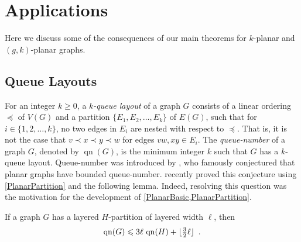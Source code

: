 \documentclass{patmorin}
\DeclareMathOperator{\tw}{tw}
\DeclareMathOperator{\qn}{qn}
\DeclarePairedDelimiter{\floor}{\lfloor}{\rfloor}
\renewcommand{\le}{\leqslant}
\renewcommand{\geq}{\geqslant}
\begin{document}
% 

\section{Applications}
\label{Applications}

Here we discuss some of the consequences of our main theorems for $k$-planar and $(g,k)$-planar graphs. 

\subsection{Queue Layouts}

For an integer $k\geq 0$, a \textit{$k$-queue layout} of a graph $G$ consists of a linear ordering $\preceq$ of $V(G)$ and a partition $\{E_1,E_2,\dots,E_k\}$ of $E(G)$, such that for $i\in\{1,2,\dots,k\}$, no two edges in $E_i$ are nested with respect to $\preceq$. That is, it is not the case that $v\prec x \prec y \prec w$ for edges $vw,xy\in E_i$. The \textit{queue-number} of a graph $G$, denoted by $\qn(G)$, is the minimum integer $k$ such that $G$ has a $k$-queue layout. Queue-number was introduced by \citet{HLR92}, who famously conjectured that planar graphs have bounded queue-number. \citet{dujmovic.joret.ea:planar} recently proved this conjecture using \cref{PlanarPartition} and the following lemma. Indeed, resolving this question was the motivation for the development of \cref{PlanarBasic,PlanarPartition}.

\begin{lem}
\label{qn}
If a graph $G$ has a layered $H$-partition of layered width $\ell$, then 
$$\qn(G)\le 3 \ell \, \qn(H) + \floor{\tfrac{3}{2}\ell}\enspace.$$
\end{lem}
\end{document}
